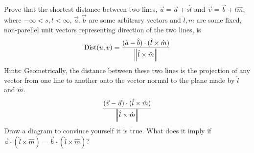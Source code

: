 \begin{Exercise}
Prove that the shortest distance between two lines, $\vec{u} = \vec{a} + s\hat{l}$ and $\vec{v} = \vec{b} + t\hat{m}$, where $-\infty < s,t < \infty$, $\vec{a}, \vec{b}$ are some arbitrary vectors and $\hat{l}, \hat{m}$ are some fixed, non-parellel unit vectors representing direction of the two lines, is
\begin{align*}
\text{Dist}(u, v) = \frac{(\hat{a}-\hat{b}) \cdot (\hat{l} \times \hat{m})}{\norm{\hat{l} \times \hat{m}}}
\end{align*}
Hints: Geometrically, the distance between these two lines is the projection of any vector from one line to another onto the vector normal to the plane made by $\hat{l}$ and $\hat{m}$.
\begin{align*}
\frac{(\vec{v} - \vec{u}) \cdot (\hat{l} \times \hat{m})}{\norm{\hat{l} \times \hat{m}}}
\end{align*}
Draw a diagram to convince yourself it is true. What does it imply if $\vec{a} \cdot (\hat{l} \times \hat{m}) = \vec{b} \cdot (\hat{l} \times \hat{m})$?
\end{Exercise}
